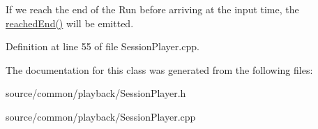 If we reach the end of the Run before arriving at the input time, the \hyperlink{class_picto_1_1_session_player_a37f89e41b206df6d3e88611f9638a394}{reached\-End()} will be emitted. 

Definition at line 55 of file Session\-Player.\-cpp.



The documentation for this class was generated from the following files\-:\begin{DoxyCompactItemize}
\item 
source/common/playback/Session\-Player.\-h\item 
source/common/playback/Session\-Player.\-cpp\end{DoxyCompactItemize}
